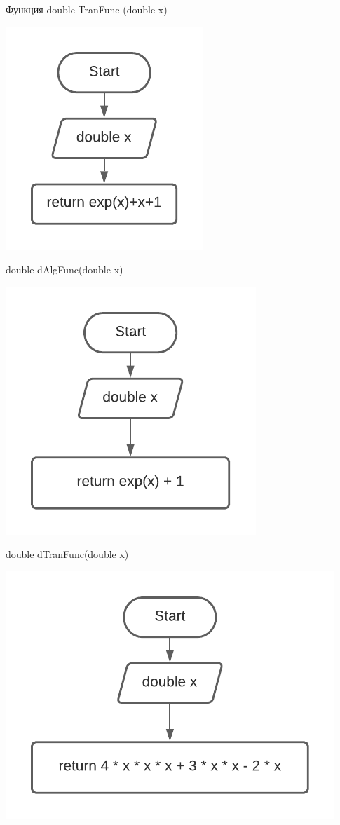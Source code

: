 Функция double TranFunc (double x)

\includegraphics[scale=0.5]{block2.pdf}

double dAlgFunc(double x)

\includegraphics[scale=0.5]{block5.pdf}

double dTranFunc(double x)

\includegraphics[scale=0.5]{block6.pdf}

